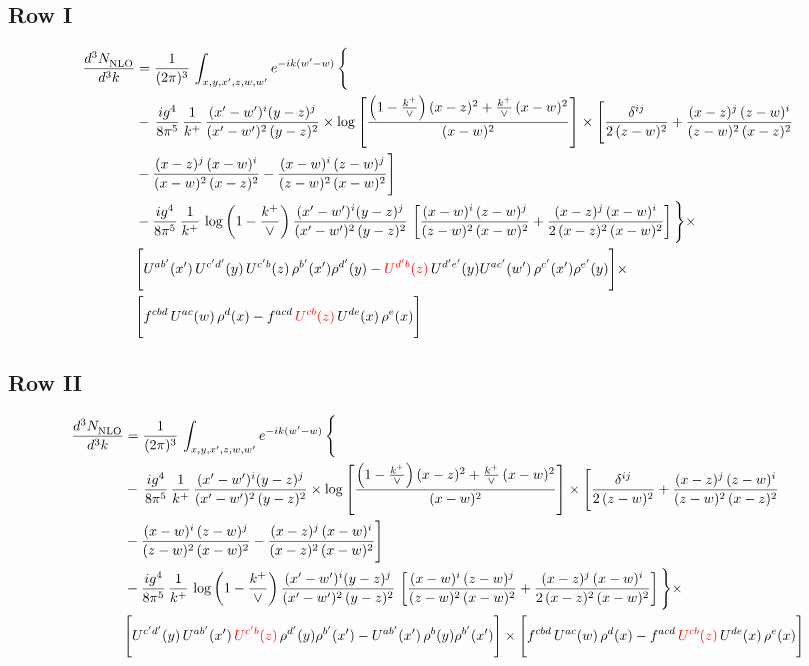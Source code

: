 \documentclass[9pt]{article}
\numberwithin{equation}{section}
\begin{document}
\subsection{Row I}
\begin{align}
     \frac{d^{3}N_{\rm NLO}^{\rm}}{d^{3}k}  & =   \frac{1}{(2\pi)^{3}}\, \int_{x,y,x',z,w,w^{\prime}} e^{-ik(w^{\prime}-w)}\, \Bigg\{\notag \\
& -\,\frac{ig^{4}}{8\pi^{5}}\,\frac{1}{k^{+}}\,\frac{(x'-w')^{i}(y-z)^{j}}{(x'-w')^{2}\,(y-z)^{2}}\times \log{\left[\frac{\left(1-\frac{k^{+}}{\vee}\right)(x-z)^{2}+\frac{k^{+}}{\vee}\,(x-w)^{2}}{(x-w)^{2}}\right]}\times \Bigg[\frac{\delta^{ij}}{2\,(z-w)^{2}}+\frac{(x-z)^{j}\,(z-w)^{i}}{(z-w)^{2}\,(x-z)^{2}}\notag \\ & -\frac{(x-z)^{j}\,(x-w)^{i}}{(x-w)^{2}\,(x-z)^{2}}-\frac{(x-w)^{i}\,(z-w)^{j}}{(z-w)^{2}\,(x-w)^{2}}\Bigg] \notag \\
& -\frac{ig^{4}}{8\pi^{5}}\,\frac{1}{k^{+}}\,\log{\left(1-\frac{k^{+}}{\vee}\right)}\,\frac{(x'-w')^{i}(y-z)^{j}}{(x'-w')^{2}\,(y-z)^{2}}\,\left[\frac{(x-w)^{i}\,(z-w)^{j}}{(z-w)^{2}\,(x-w)^{2}}+\frac{(x-z)^{j}\,(x-w)^{i}}{2\,(x-z)^{2}\, (x-w)^{2}}\right]\Bigg\}\times \notag \\ &  \Bigg[U^{ab'}(x')\,U^{c'd'}(y)\,U^{c'b}(z)\,\rho^{b'}(x')\rho^{d'}(y)-{\color{red}U^{d'b}(z)}\,U^{d'e'}(y)U^{ac'}(w')\,\rho^{c'}(x')\rho^{e'}(y)\Bigg]\times\notag \\ & \Bigg[f^{cbd}\,U^{ac}(w)\,\rho^{d}(x)-f^{acd}\, {\color{red}U^{cb}(z)}\,U^{de}(x)\,\rho^{e}(x)\Bigg]
\end{align}
\subsection{Row II}
\begin{align}
     \frac{d^{3}N_{\rm NLO}^{\rm}}{d^{3}k}  & =   \frac{1}{(2\pi)^{3}}\, \int_{x,y,x',z,w,w^{\prime}} e^{-ik(w^{\prime}-w)}\, \Bigg\{\notag \\
& -\,\frac{ig^{4}}{8\pi^{5}}\,\frac{1}{k^{+}}\,\frac{(x'-w')^{i}(y-z)^{j}}{(x'-w')^{2}\,(y-z)^{2}}\times \log{\left[\frac{\left(1-\frac{k^{+}}{\vee}\right)(x-z)^{2}+\frac{k^{+}}{\vee}\,(x-w)^{2}}{(x-w)^{2}}\right]}\times \Bigg[\frac{\delta^{ij}}{2\,(z-w)^{2}}+\frac{(x-z)^{j}\,(z-w)^{i}}{(z-w)^{2}\,(x-z)^{2}}\notag \\ & -\frac{(x-w)^{i}\,(z-w)^{j}}{(z-w)^{2}\,(x-w)^{2}}-\frac{(x-z)^{j}\,(x-w)^{i}}{(x-z)^{2}\,(x-w)^{2}}\Bigg] \notag \\
& -\frac{ig^{4}}{8\pi^{5}}\,\frac{1}{k^{+}}\,\log{\left(1-\frac{k^{+}}{\vee}\right)}\,\frac{(x'-w')^{i}(y-z)^{j}}{(x'-w')^{2}\,(y-z)^{2}}\,\left[\frac{(x-w)^{i}\,(z-w)^{j}}{(z-w)^{2}\,(x-w)^{2}}+\frac{(x-z)^{j}\,(x-w)^{i}}{2\,(x-z)^{2}\, (x-w)^{2}}\right]\Bigg\}\times \notag \\ & \Bigg[U^{c'd'}(y)\,U^{ab'}(x')\,{\color{red}U^{c'b}(z)}\,\rho^{d'}(y)\rho^{b'}(x')-U^{ab'}(x')\,\rho^{b}(y)\rho^{b'}(x')\Bigg]\times\Bigg[f^{cbd}\,U^{ac}(w)\,\rho^{d}(x)-f^{acd}\, {\color{red}U^{cb}(z)}\,U^{de}(x)\,\rho^{e}(x)\Bigg]
\end{align}
\end{document}
